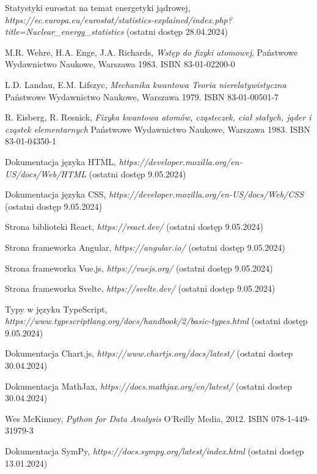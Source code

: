 \documentclass{SGGW-thesis}
\begin{document}
\begin{thebibliography}{9}
	Statystyki eurostat na temat energetyki jądrowej, 
	\textit{https://ec.europa.eu/eurostat/statistics-explained/index.php?title=Nuclear\_energy\_statistics}
	(ostatni dostęp 28.04.2024)

	M.R. Wehre, H.A. Enge, J.A. Richards,
	\textit{Wstęp do fizyki atomowej}, 
	Państwowe Wydawnictwo Naukowe, Warszawa 1983. ISBN 83-01-02200-0
	
	L.D. Landau, E.M. Lifszyc,
	\textit{Mechanika kwantowa Teoria nierelatywistyczna}
	Państwowe Wydawnictwo Naukowe, Warszawa 1979. ISBN 83-01-00501-7
	
	R. Eisberg, R. Resnick,
	\textit{Fizyka kwantowa atomów, cząsteczek, ciał stałych, jąder i cząstek elementarnych}
	Państwowe Wydawnictwo Naukowe, Warszawa 1983. ISBN 83-01-04350-1
	
	Dokumentacja języka HTML,
	\textit{https://developer.mozilla.org/en-US/docs/Web/HTML}
	(ostatni dostęp 9.05.2024)
	
	Dokumentacja języka CSS,
	\textit{https://developer.mozilla.org/en-US/docs/Web/CSS}
	(ostatni dostęp 9.05.2024)
	
	Strona biblioteki React,
	\textit{https://react.dev/}
	(ostatni dostęp 9.05.2024)
	
	Strona frameworka Angular,
	\textit{https://angular.io/}
	(ostatni dostęp 9.05.2024)
	
	Strona frameworka Vue.js,
	\textit{https://vuejs.org/}
	(ostatni dostęp 9.05.2024)
	
	Strona frameworka Svelte,
	\textit{https://svelte.dev/}
	(ostatni dostęp 9.05.2024)
	
	Typy w języku TypeScript,
	\textit{https://www.typescriptlang.org/docs/handbook/2/basic-types.html}
	(ostatni dostęp 9.05.2024)
	
	Dokumentacja Chart.js, 
	\textit{https://www.chartjs.org/docs/latest/}
	(ostatni dostep 30.04.2024)
	
	Dokumentacja MathJax,
	\textit{https://docs.mathjax.org/en/latest/}
	(ostatni dostep 30.04.2024)
	
	Wes McKinney, 
	\textit{Python for Data Analysis}
	O'Reilly Media, 2012. ISBN 078-1-449-31979-3
	
	Dokumentacja SymPy, 
	\textit{https://docs.sympy.org/latest/index.html}
	(ostatni dostęp 13.01.2024)
	

\end{thebibliography}
\end{document}

